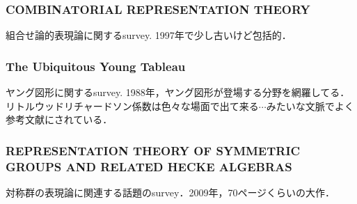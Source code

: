 \documentclass{ujarticle}[12pt,a4pepar]
\theoremstyle{jplain}
\begin{document}
\subsubsection{COMBINATORIAL REPRESENTATION THEORY}
組合せ論的表現論に関するsurvey.
1997年で少し古いけど包括的．

\subsubsection{The Ubiquitous Young Tableau}
ヤング図形に関するsurvey.
1988年，ヤング図形が登場する分野を網羅してる．
リトルウッドリチャードソン係数は色々な場面で出て来る$\cdots$みたいな文脈でよく参考文献にされている．

\subsubsection{REPRESENTATION THEORY OF SYMMETRIC GROUPS AND RELATED HECKE ALGEBRAS}
対称群の表現論に関連する話題のsurvey．2009年，70ページくらいの大作．
\end{document}
